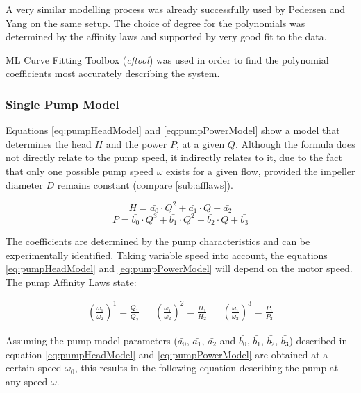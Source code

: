 A very similar modelling process was already successfully used by Pedersen and Yang 
\cite{YangMultiPump2008} on the same setup.
The choice of degree for the polynomials was determined by the affinity laws \cite{Volk2014}
and supported by very good fit to the data.

ML Curve Fitting Toolbox (\textit{cftool}) \cite{cftool}
was used in order to find the polynomial coefficients most accurately describing the system.

\subsubsection{Single Pump Model}
Equations \ref{eq:pumpHeadModel} and \ref{eq:pumpPowerModel} show a model that 
determines the head $H$ and the power $P$,
at a given $Q$. 
Although the formula does not directly relate to the pump speed, it indirectly relates to it,
due to the fact that only one possible pump speed $\omega$ exists for a given flow,
provided the impeller diameter $D$ remains constant (compare \ref{sub:afflaws}).

\begin{equation}
	H = \bar{a_{0}} \cdot Q^2 + \bar{a_{1}} \cdot Q + \bar{a_{2}}
	\label{eq:pumpHeadModel}
\end{equation}
\begin{equation}
	P = \bar{b_{0}} \cdot Q^3 + \bar{b_{1}} \cdot Q^2 + \bar{b_{2}} \cdot Q + \bar{b_{3}}
	\label{eq:pumpPowerModel}
\end{equation}

The coefficients are determined by the pump characteristics and can be experimentally identified.
Taking variable speed into account, the equations \ref{eq:pumpHeadModel}  and \ref{eq:pumpPowerModel}
will depend on the motor speed. The pump Affinity Laws state:

\begin{align*}
	\left(\frac{\omega_1}{\omega_2}\right)^1 = \frac{Q_1}{Q_2} && 
	\left(\frac{\omega_1}{\omega_2}\right)^2 = \frac{H_1}{H_2} &&
	\left(\frac{\omega_1}{\omega_2}\right)^3 = \frac{P_1}{P_2}	
\end{align*}

Assuming the pump model parameters ($\bar{a_{0}}$, $\bar{a_{1}}$, $\bar{a_{2}}$ and $\bar{b_{0}}$,
$\bar{b_{1}}$, $\bar{b_{2}}$, $\bar{b_{3}}$) described in equation \ref{eq:pumpHeadModel} and 
\ref{eq:pumpPowerModel} are obtained at a certain speed $\bar{\omega_{0}}$, 
this results in the following equation describing the pump at any speed $\omega$.

